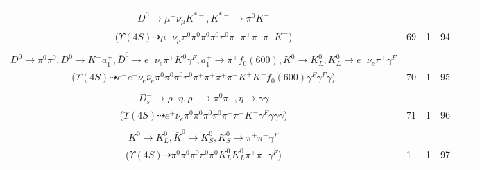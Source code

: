 \documentclass[landscape]{article}
\newcounter{rownumbers}
\newcommand\rn{\stepcounter{rownumbers}\arabic{rownumbers}}
\newcommand{\EOLP}{\\ \hline} %
\newcommand{\topoTags}[1]{#1} %
\begin{document}
\begin{longtable}{clcccc}
\rn & \makecell[l]{ $ 
\Upsilon(4S) \rightarrow B^{0} \bar{B}^{0} ,
B^{0} \rightarrow \pi^{0} \bar{D}^{0} ,
\bar{B}^{0} \rightarrow \pi^{-} \omega D^{*+} ,
\bar{D}^{0} \rightarrow \pi^{0} \pi^{0} ,
\omega \rightarrow \pi^{0} \pi^{+} \pi^{-} ,
D^{*+} \rightarrow \pi^{+} D^{0} ,
$ \\ $
D^{0} \rightarrow \mu^{+} \nu_{\mu} K^{*-} ,
K^{*-} \rightarrow \pi^{0} K^{-} 
$ \\ ($
\Upsilon(4S) \dashrightarrow \mu^{+} \nu_{\mu} \pi^{0} \pi^{0} \pi^{0} \pi^{0} \pi^{0} \pi^{+} \pi^{+} \pi^{-} \pi^{-} K^{-} 
$) } & \topoTags{69 & }1 & 94 \EOLP

\rn & \makecell[l]{ $ 
\Upsilon(4S) \rightarrow B^{0} \bar{B}^{0} ,
B^{0} \rightarrow K^{*} D^{*0} \bar{D}^{*0} ,
\bar{B}^{0} \rightarrow \pi^{0} D^{0} ,
K^{*} \rightarrow \pi^{-} K^{+} ,
D^{*0} \rightarrow D^{0} \gamma ,
\bar{D}^{*0} \rightarrow \pi^{0} \bar{D}^{0} ,
$ \\ $
D^{0} \rightarrow \pi^{0} \pi^{0} ,
D^{0} \rightarrow K^{-} a_{1}^{+} ,
\bar{D}^{0} \rightarrow e^{-} \bar{\nu}_{e} \pi^{+} K^{0} \gamma^{F} ,
a_{1}^{+} \rightarrow \pi^{+} f_{0}(600) ,
K^{0} \rightarrow K_{L}^{0} ,
K_{L}^{0} \rightarrow e^{-} \nu_{e} \pi^{+} \gamma^{F} 
$ \\ ($
\Upsilon(4S) \dashrightarrow e^{-} e^{-} \nu_{e} \bar{\nu}_{e} \pi^{0} \pi^{0} \pi^{0} \pi^{0} \pi^{+} \pi^{+} \pi^{+} \pi^{-} K^{+} K^{-} f_{0}(600) \gamma^{F} \gamma^{F} \gamma 
$) } & \topoTags{70 & }1 & 95 \EOLP

\rn & \makecell[l]{ $ 
\Upsilon(4S) \rightarrow B^{0} \bar{B}^{0} ,
B^{0} \rightarrow \pi^{0} \bar{D}^{0} ,
\bar{B}^{0} \rightarrow D^{+} D_{s}^{*-} ,
\bar{D}^{0} \rightarrow \pi^{0} \pi^{0} ,
D^{+} \rightarrow e^{+} \nu_{e} \pi^{+} K^{-} \gamma^{F} ,
D_{s}^{*-} \rightarrow D_{s}^{-} \gamma ,
$ \\ $
D_{s}^{-} \rightarrow \rho^{-} \eta ,
\rho^{-} \rightarrow \pi^{0} \pi^{-} ,
\eta \rightarrow \gamma \gamma 
$ \\ ($
\Upsilon(4S) \dashrightarrow e^{+} \nu_{e} \pi^{0} \pi^{0} \pi^{0} \pi^{0} \pi^{+} \pi^{-} K^{-} \gamma^{F} \gamma \gamma \gamma 
$) } & \topoTags{71 & }1 & 96 \EOLP

\rn & \makecell[l]{ $ 
\Upsilon(4S) \rightarrow B^{0} \bar{B}^{0} ,
B^{0} \rightarrow K^{*} \eta_{c} ,
\bar{B}^{0} \rightarrow \pi^{0} D^{0} ,
K^{*} \rightarrow \pi^{0} K_{L}^{0} ,
\eta_{c} \rightarrow \pi^{0} K^{0} \bar{K}^{0} ,
D^{0} \rightarrow \pi^{0} \pi^{0} ,
$ \\ $
K^{0} \rightarrow K_{L}^{0} ,
\bar{K}^{0} \rightarrow K_{S}^{0} ,
K_{S}^{0} \rightarrow \pi^{+} \pi^{-} \gamma^{F} 
$ \\ ($
\Upsilon(4S) \dashrightarrow \pi^{0} \pi^{0} \pi^{0} \pi^{0} \pi^{0} K_{L}^{0} K_{L}^{0} \pi^{+} \pi^{-} \gamma^{F} 
$) } & \topoTags{1 & }1 & 97 \EOLP


\end{longtable}
\end{document}

